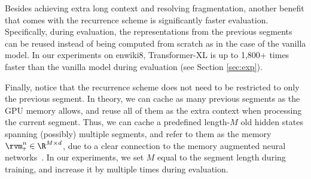 Besides achieving extra long context and resolving fragmentation, another benefit that comes with the recurrence scheme is significantly faster evaluation.
Specifically, during evaluation, the representations from the previous segments can be reused instead of being computed from scratch as in the case of the vanilla model.
In our experiments on enwiki8, Transformer-XL is up to 1,800+ times faster than the vanilla model during evaluation (see Section \ref{sec:exp}).


Finally, notice that the recurrence scheme does not need to be restricted to only the previous segment.
In theory, we can cache as many previous segments as the GPU memory allows, and reuse all of them as the extra context when processing the current segment.
Thus, we can cache a predefined length-$M$ old hidden states spanning (possibly) multiple segments, and refer to them as the memory $\rvm_{\tau}^{n} \in \R^{M \times d}$, due to a clear connection to the memory augmented neural networks~\citep{graves2014neural,weston2014memory}.
In our experiments, we set $M$ equal to the segment length during training, and increase it by multiple times during evaluation.


